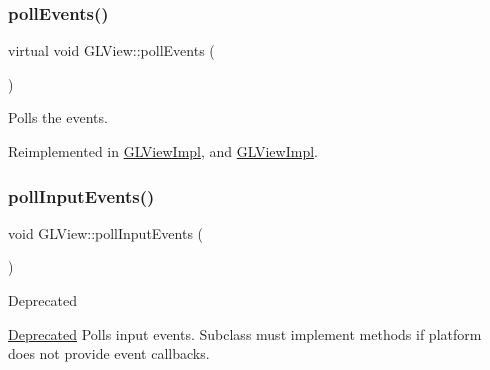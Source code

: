 \mbox{\label{classGLView_a5e5a3b7fd25698d24df6c53f617fefdf}} 
\subsubsection{\texorpdfstring{poll\+Events()}{pollEvents()}\hspace{0.1cm}{\footnotesize\ttfamily [2/2]}}
{\footnotesize\ttfamily virtual void G\+L\+View\+::poll\+Events (\begin{DoxyParamCaption}{ }\end{DoxyParamCaption})\hspace{0.3cm}{\ttfamily [virtual]}}

Polls the events. 

Reimplemented in \hyperlink{classGLViewImpl_aafbe949f616506c1faeb090fe9456bcc}{G\+L\+View\+Impl}, and \hyperlink{classGLViewImpl_aafbe949f616506c1faeb090fe9456bcc}{G\+L\+View\+Impl}.

\mbox{\label{classGLView_a5b93395a827f1886414a5d4186544ddb}} 
\subsubsection{\texorpdfstring{poll\+Input\+Events()}{pollInputEvents()}\hspace{0.1cm}{\footnotesize\ttfamily [1/2]}}
{\footnotesize\ttfamily void G\+L\+View\+::poll\+Input\+Events (\begin{DoxyParamCaption}{ }\end{DoxyParamCaption})\hspace{0.3cm}{\ttfamily [virtual]}}

\begin{DoxyRefDesc}{Deprecated}
\item[\hyperlink{deprecated__deprecated000116}{Deprecated}]Polls input events. Subclass must implement methods if platform does not provide event callbacks. \end{DoxyRefDesc}
\mbox{\label{classGLView_ace980598802adb0f6c06b22525eeb062}} 
